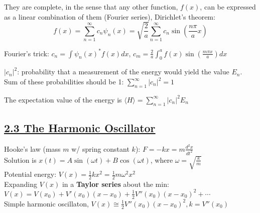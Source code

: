 


They are complete, in the sense that any other function, $f(x)$, can be expressed as a linear combination of them (Fourier series), Dirichlet's theorem:
    $$f(x) = \sum_{n=1}^{\infty} c_n \psi_n(x) = \sqrt{\frac{2}{a}} \sum_{n=1}^{\infty} c_n \sin(\frac{n \pi}{a} x)$$

Fourier's trick: $c_n = \int \psi_n(x)^* f(x) dx$, 
$c_m = \frac{2}{a} \int_0^a f(x) \sin(\frac{m \pi x}{a}) dx$

$|c_n|^2$: probability that a measurement of the energy would yield the value $E_n$. \\

Sum of these probabilities should be 1: $\sum_{n=1}^{\infty} |c_n|^2 = 1$

The expectation value of the energy is $\langle H \rangle = \sum_{n=1}^{\infty} |c_n|^2 E_n$

\subsection{\underline{2.3 The Harmonic Oscillator}}
Hooke's law (mass $m$ w/ spring constant $k$): $F = -kx = m \frac{d^2 x}{d t^2}$ \\
Solution is $x(t) = A \sin(\omega t) + B \cos(\omega t)$, where $\omega = \sqrt{\frac{k}{m}}$ \\
Potential energy: $V(x) = \frac{1}{2} k x^2 = \frac{1}{2} m \omega^2 x^2$ \\

Expanding $V(x)$ in a \textbf{Taylor series} about the min: $V(x) = V(x_0) + V'(x_0) (x - x_0) + \frac{1}{2} V''(x_0)(x- x_0)^2 + \cdots$ \\
Simple harmonic oscillaton, $V(x) \cong \frac{1}{2} V''(x_0) (x - x_0)^2, k = V''(x_0)$

